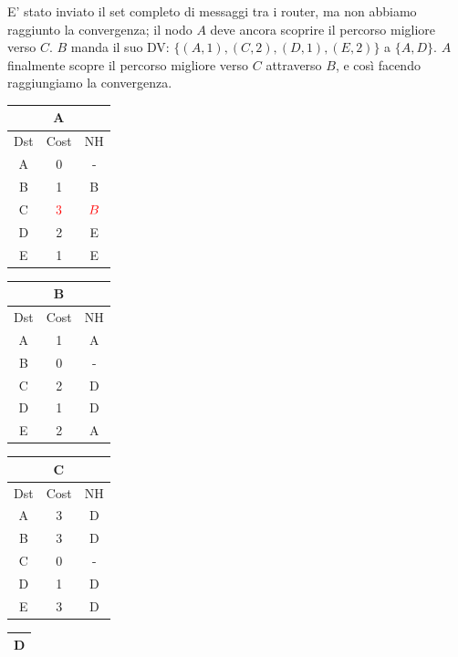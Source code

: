 \documentclass[10pt]{article}
\begin{document}
	\newline \newline
	E' stato inviato il set completo di messaggi tra i router, ma non abbiamo raggiunto la convergenza; il nodo $A$ deve ancora scoprire il percorso migliore verso $C$.
	\newline \newline
	$B$ manda il suo DV: $\{(A,1),(C,2),(D,1),(E,2)\}$ a $\{A,D\}$.
	\newline
	$A$ finalmente scopre il percorso migliore verso $C$ attraverso $B$, e così facendo raggiungiamo la convergenza.
	\begin{table}[h!]
		\begin{tabular}{|c||c||c|}
 			\hline
	 		\multicolumn{3}{|c|}{A} \\
 			\hline
 			Dst & Cost & NH\\
 			\hline
 			A & 0 & - \\
 			B & 1 & B \\
 			C & $\color{red} 3$ & $\color{red} B$ \\
 			D & 2 & E \\
 			E & 1 & E \\
 			\hline
		\end{tabular}
		\begin{tabular}{|c||c||c|}
 			\hline
	 		\multicolumn{3}{|c|}{B} \\
 			\hline
 			Dst & Cost & NH\\
 			\hline
 			A & 1 & A \\
 			B & 0 & - \\
 			C & 2 & D \\
 			D & 1 & D \\
 			E & 2 & A \\
 			\hline
		\end{tabular}
		\begin{tabular}{|c||c||c|}
 			\hline
	 		\multicolumn{3}{|c|}{C} \\
 			\hline
 			Dst & Cost & NH\\
 			\hline
 			A & 3 & D \\
 			B &3 & D \\
 			C & 0 & - \\
 			D & 1 & D \\
 			E & 3 & D \\
 			\hline
		\end{tabular}
		\begin{tabular}{|c||c||c|}
 			\hline
	 		\multicolumn{3}{|c|}{D} \\
 			\hline

\end{tabular}
\end{table}
\end{document}
